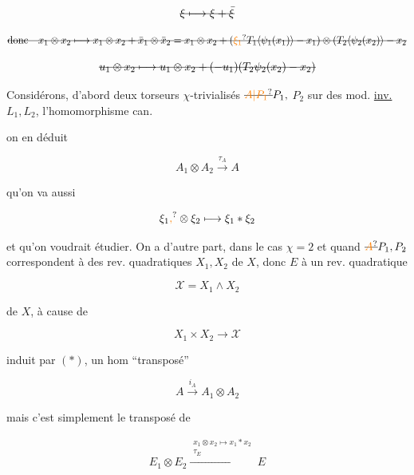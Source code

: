 \[
\deleted{\xi\longmapsto\xi+\bar\xi}
\]

\[
\deleted{\text{donc}\quad x_1\otimes x_2\longmapsto
x_1\otimes x_2+\bar x_1\otimes\bar x_2=x_1\otimes x_2+
(\unsure{\xi_1}T_1\inserted{\psi_1(x_1)}-x_1)\otimes
(T_2\inserted{\psi_2(x_2)}-x_2}
\]


\[
\deleted{u_1\otimes x_2\longmapsto u_1\otimes x_2+(-u_1)(T_2\psi_2(x_2)-x_2)}
\]



Considérons, d'abord deux torseurs $\chi$-trivialisés $\deleted{\unsure{A|P_1}}P_1,$ $P_2$ sur des mod. \uline{inv.} $L_1,L_2$, l'homomorphisme can.


on en déduit

\[
A_1\otimes A_2\xrightarrow{\tau_A}A
\]

qu'on va aussi 

\[
\xi_1\unsure{,}\otimes\xi_2\longmapsto\xi_1*\xi_2
\]

et qu'on voudrait étudier. On a d'autre part, dans le cas $\chi=2$ et quand $\deleted{\unsure{A}}P_1,P_2$ correspondent à  des rev. quadratiques $X_1,X_2$ de $X$, donc $E$ à un rev. quadratique

\[
\mathscr X=X_1\wedge X_2
\]

de $X$, à cause de

\[
X_1\times X_2\longrightarrow\mathscr X
\]

induit par $(*)$, un hom ``transposé''

\[
A\xrightarrow{i_A}A_1\otimes A_2
\]

mais c'est simplement le transposé de

\[
E_1\otimes E_2\xrightarrow{\substack{x_1\otimes x_2\mapsto x_1*x_2\\\tau_E}}E
\]

